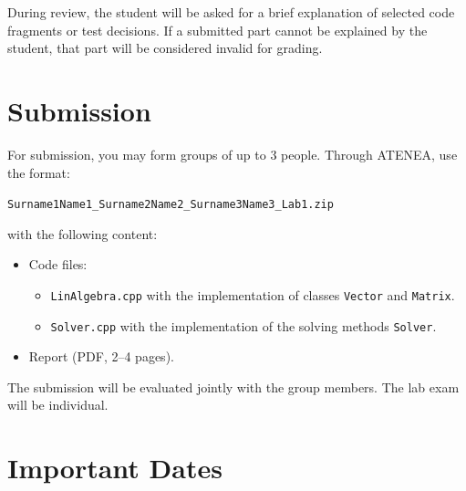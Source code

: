 \documentclass[11pt,a4paper]{article}
\begin{document}
During review, the student will be asked for a brief explanation of selected code fragments or test decisions. If a submitted part cannot be explained by the
student, that part will be considered invalid for grading.

\section*{Submission}
For submission, you may form groups of up to 3 people. Through ATENEA,
use the format:
\begin{center}
\texttt{Surname1Name1\_Surname2Name2\_Surname3Name3\_Lab1.zip}
\end{center}
with the following content:
\begin{itemize}[leftmargin=*]
    \item Code files:
    \begin{itemize}[leftmargin=*]
        \item \texttt{LinAlgebra.cpp} with the implementation of classes \texttt{Vector} and \texttt{Matrix}.
        \item \texttt{Solver.cpp} with the implementation of the solving methods \texttt{Solver}.
    \end{itemize}
    \item Report (PDF, 2--4 pages).
\end{itemize}

The submission will be evaluated jointly with the group members.
The lab exam will be individual.

\section*{Important Dates}
\noindent{}
\end{document}
